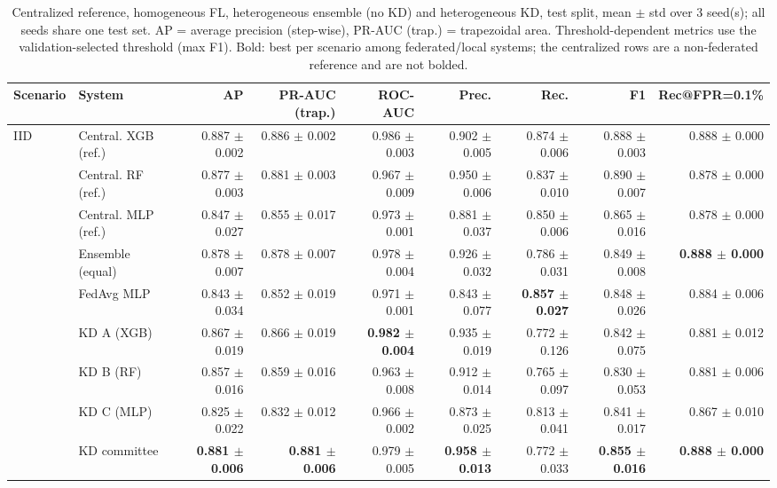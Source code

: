 \begin{table}[t]
\centering
\scriptsize
\caption{Centralized reference, homogeneous FL, heterogeneous ensemble (no KD) and heterogeneous KD, test split, mean $\pm$ std over 3 seed(s); all seeds share one test set. AP = average precision (step-wise), PR-AUC (trap.) = trapezoidal area. Threshold-dependent metrics use the validation-selected threshold (max F1). Bold: best per scenario among federated/local systems; the centralized rows are a non-federated reference and are not bolded.}
\label{tab:main}
\begin{tabular}{llrrrrrrr}
\toprule
Scenario & System & AP & PR-AUC (trap.) & ROC-AUC & Prec. & Rec. & F1 & Rec@FPR=0.1\% \\
\midrule
IID & Central. XGB (ref.) & 0.887 $\pm$ 0.002 & 0.886 $\pm$ 0.002 & 0.986 $\pm$ 0.003 & 0.902 $\pm$ 0.005 & 0.874 $\pm$ 0.006 & 0.888 $\pm$ 0.003 & 0.888 $\pm$ 0.000 \\
 & Central. RF (ref.) & 0.877 $\pm$ 0.003 & 0.881 $\pm$ 0.003 & 0.967 $\pm$ 0.009 & 0.950 $\pm$ 0.006 & 0.837 $\pm$ 0.010 & 0.890 $\pm$ 0.007 & 0.878 $\pm$ 0.000 \\
 & Central. MLP (ref.) & 0.847 $\pm$ 0.027 & 0.855 $\pm$ 0.017 & 0.973 $\pm$ 0.001 & 0.881 $\pm$ 0.037 & 0.850 $\pm$ 0.006 & 0.865 $\pm$ 0.016 & 0.878 $\pm$ 0.000 \\
 & Ensemble (equal) & 0.878 $\pm$ 0.007 & 0.878 $\pm$ 0.007 & 0.978 $\pm$ 0.004 & 0.926 $\pm$ 0.032 & 0.786 $\pm$ 0.031 & 0.849 $\pm$ 0.008 & \textbf{0.888 $\pm$ 0.000} \\
 & FedAvg MLP & 0.843 $\pm$ 0.034 & 0.852 $\pm$ 0.019 & 0.971 $\pm$ 0.001 & 0.843 $\pm$ 0.077 & \textbf{0.857 $\pm$ 0.027} & 0.848 $\pm$ 0.026 & 0.884 $\pm$ 0.006 \\
 & KD A (XGB) & 0.867 $\pm$ 0.019 & 0.866 $\pm$ 0.019 & \textbf{0.982 $\pm$ 0.004} & 0.935 $\pm$ 0.019 & 0.772 $\pm$ 0.126 & 0.842 $\pm$ 0.075 & 0.881 $\pm$ 0.012 \\
 & KD B (RF) & 0.857 $\pm$ 0.016 & 0.859 $\pm$ 0.016 & 0.963 $\pm$ 0.008 & 0.912 $\pm$ 0.014 & 0.765 $\pm$ 0.097 & 0.830 $\pm$ 0.053 & 0.881 $\pm$ 0.006 \\
 & KD C (MLP) & 0.825 $\pm$ 0.022 & 0.832 $\pm$ 0.012 & 0.966 $\pm$ 0.002 & 0.873 $\pm$ 0.025 & 0.813 $\pm$ 0.041 & 0.841 $\pm$ 0.017 & 0.867 $\pm$ 0.010 \\
 & KD committee & \textbf{0.881 $\pm$ 0.006} & \textbf{0.881 $\pm$ 0.006} & 0.979 $\pm$ 0.005 & \textbf{0.958 $\pm$ 0.013} & 0.772 $\pm$ 0.033 & \textbf{0.855 $\pm$ 0.016} & \textbf{0.888 $\pm$ 0.000} \\

\end{tabular}
\end{table}
